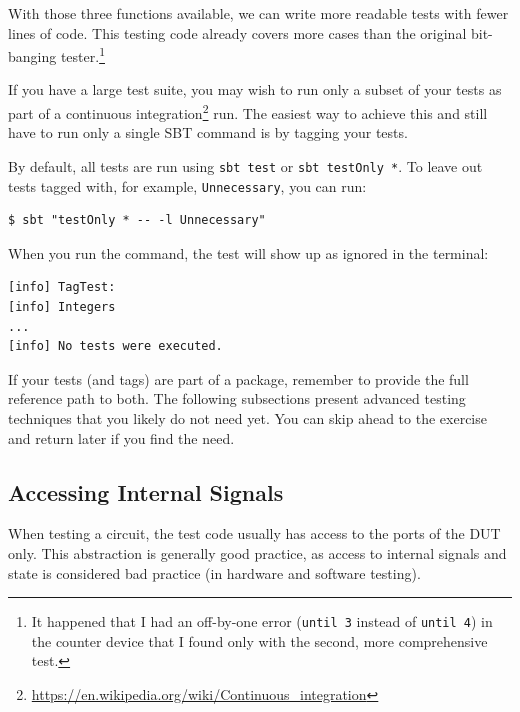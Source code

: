 \documentclass[%
    10pt,
    headinclude, footexclude,
    openright, %
    notitlepage,
    cleardoubleempty,
    headsepline,
    pointlessnumbers,
    bibtotoc, idxtotoc,
    ]{scrbook}
\newcommand{\code}[1]{{\lstinline[basicstyle=\small\ttfamily]{#1}}}
\newcommand{\myref}[2]{\href{#1}{#2}}
\renewcommand{\myref}[2]{{#2}{\footnote{\url{#1}}}}
\begin{document}
With those three functions available, we can write more readable tests with fewer lines of code.
This testing code already covers more cases than the original bit-banging
tester.\footnote{It happened that I had an off-by-one error (\code{until 3} instead of \code{until 4})
in the counter device that I found only with the second, more comprehensive test.}



If you have a large test suite, you may wish to run only a subset of your tests
as part of a \myref{https://en.wikipedia.org/wiki/Continuous_integration}{continuous integration}
run. The easiest way to achieve this and still have to run only a single SBT command
is by tagging your tests.


\noindent By default, all tests are run using \code{sbt test} or \code{sbt testOnly *}.
To leave out tests tagged with, for example, \code{Unnecessary}, you can run:

\begin{verbatim}
$ sbt "testOnly * -- -l Unnecessary"
\end{verbatim}

\noindent When you run the command, the test will show up as ignored in the terminal:

\begin{verbatim}
[info] TagTest:
[info] Integers
...
[info] No tests were executed.
\end{verbatim}

If your tests (and tags) are part of a package, remember to provide the full
reference path to both.
The following subsections present advanced testing techniques that you likely do
not need yet. You can skip ahead to the exercise and return later if you find the need.

\subsection{Accessing Internal Signals}

When testing a circuit, the test code usually has access to the ports of the DUT only.
This abstraction is generally good practice, as access to internal signals and state is considered
bad practice (in hardware and software testing).
\end{document}

